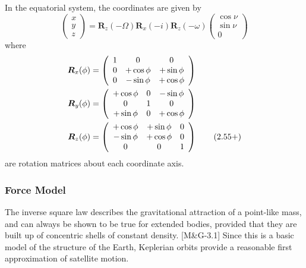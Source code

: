 \documentclass[11pt]{article}
\begin{document}
In the equatorial system, the coordinates are given by
\begin{equation}
  \left(\begin{array}{c} x \\ y \\ z \end{array}\right)
  = \boldsymbol{R}_z(-\Omega)\boldsymbol{R}_x(-i)\boldsymbol{R}_z(-\omega)
  \left(\begin{array}{c} \cos\nu \\ \sin\nu \\ 0 \end{array}\right) \label{2.50}\tag{2.50}
\end{equation}
where
\begin{align}
  \boldsymbol{R}_x(\phi) &= \left(
    \begin{array}{ccc}
      1         & 0         & 0 \\
      0         & +\cos\phi & +\sin\phi \\
      0         & -\sin\phi & +\cos\phi
    \end{array}\right) \notag \\
  \boldsymbol{R}_y(\phi) &= \left(
    \begin{array}{ccc}
      +\cos\phi & 0         & -\sin\phi \\
      0         & 1         & 0 \\
      +\sin\phi & 0         & +\cos\phi
    \end{array}\right) \notag \\
  \boldsymbol{R}_z(\phi) &= \left(
    \begin{array}{ccc}
      +\cos\phi & +\sin\phi & 0 \\
      -\sin\phi & +\cos\phi & 0 \\
      0         & 0         & 1
    \end{array}\right) \label{2.55+}\tag{2.55+}
\end{align}
are rotation matrices about each coordinate axis.

\subsubsection{Force Model}

The inverse square law describes the gravitational
attraction of a point-like mass, and can always be shown to be true
for extended bodies, provided that they are built up of concentric
shells of constant density. [M\&G-3.1] Since this is a basic model of the
structure of the Earth, Keplerian orbits provide a reasonable first
approximation of satellite motion.
\end{document}
